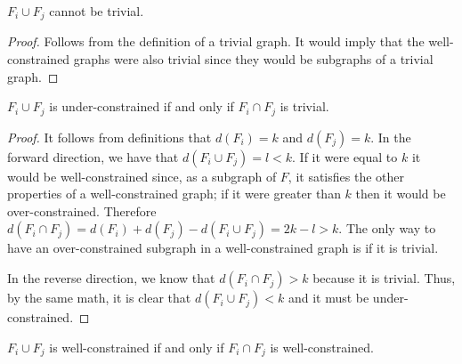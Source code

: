 \begin{lemma}\label{t-l1}
$F_i\cup F_j$ cannot be trivial.
\end{lemma}

\begin{proof}

Follows from the definition of a trivial graph. It would imply that the well-constrained graphs were also trivial since they would be subgraphs of a trivial graph.
\end{proof}


\begin{lemma}\label{uc-l1}
$F_i\cup F_j$ is under-constrained if and only if $F_i\cap F_j$ is trivial.
\end{lemma}

\begin{proof}
It follows from definitions that $d(F_i)=k$ and $d(F_j)=k$. In the forward direction, we have that $d(F_i\cup F_j)=l<k$. If it were equal to $k$ it would be well-constrained since, as a subgraph of $F$, it satisfies the other properties of a well-constrained graph; if it were greater than $k$ then it would be over-constrained. Therefore $d(F_i\cap F_j)=d(F_i)+d(F_j)-d(F_i\cup F_j)=2k-l>k$. The only way to have an over-constrained subgraph in a well-constrained graph is if it is trivial.

In the reverse direction, we know that $d(F_i\cap F_j)>k$ because it is trivial. Thus, by the same math, it is clear that $d(F_i\cup F_j)<k$ and it must be under-constrained.
\end{proof}


\begin{lemma}\label{wc-l1}
$F_i\cup F_j$ is well-constrained if and only if $F_i\cap F_j$ is well-constrained.
\end{lemma}

